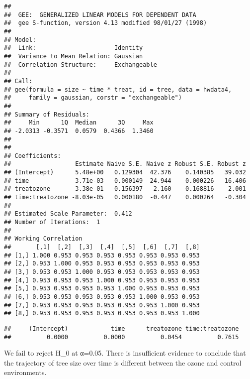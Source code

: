 \documentclass[
]{article}
\newenvironment{Shaded}{\begin{snugshade}}{\end{snugshade}}
\newcommand{\AttributeTok}[1]{\textcolor[rgb]{0.13,0.29,0.53}{#1}}
\newcommand{\CommentTok}[1]{\textcolor[rgb]{0.56,0.35,0.01}{\textit{#1}}}
\newcommand{\DecValTok}[1]{\textcolor[rgb]{0.00,0.00,0.81}{#1}}
\newcommand{\FunctionTok}[1]{\textcolor[rgb]{0.13,0.29,0.53}{\textbf{#1}}}
\newcommand{\NormalTok}[1]{#1}
\newcommand{\SpecialCharTok}[1]{\textcolor[rgb]{0.81,0.36,0.00}{\textbf{#1}}}
\begin{document}
\begin{verbatim}
## 
##  GEE:  GENERALIZED LINEAR MODELS FOR DEPENDENT DATA
##  gee S-function, version 4.13 modified 98/01/27 (1998) 
## 
## Model:
##  Link:                      Identity 
##  Variance to Mean Relation: Gaussian 
##  Correlation Structure:     Exchangeable 
## 
## Call:
## gee(formula = size ~ time * treat, id = tree, data = hwdata4, 
##     family = gaussian, corstr = "exchangeable")
## 
## Summary of Residuals:
##     Min      1Q  Median      3Q     Max 
## -2.0313 -0.3571  0.0579  0.4366  1.3460 
## 
## 
## Coefficients:
##                  Estimate Naive S.E. Naive z Robust S.E. Robust z
## (Intercept)      5.48e+00   0.129304  42.376    0.140385   39.032
## time             3.71e-03   0.000149  24.944    0.000226   16.406
## treatozone      -3.38e-01   0.156397  -2.160    0.168816   -2.001
## time:treatozone -8.03e-05   0.000180  -0.447    0.000264   -0.304
## 
## Estimated Scale Parameter:  0.412
## Number of Iterations:  1
## 
## Working Correlation
##       [,1]  [,2]  [,3]  [,4]  [,5]  [,6]  [,7]  [,8]
## [1,] 1.000 0.953 0.953 0.953 0.953 0.953 0.953 0.953
## [2,] 0.953 1.000 0.953 0.953 0.953 0.953 0.953 0.953
## [3,] 0.953 0.953 1.000 0.953 0.953 0.953 0.953 0.953
## [4,] 0.953 0.953 0.953 1.000 0.953 0.953 0.953 0.953
## [5,] 0.953 0.953 0.953 0.953 1.000 0.953 0.953 0.953
## [6,] 0.953 0.953 0.953 0.953 0.953 1.000 0.953 0.953
## [7,] 0.953 0.953 0.953 0.953 0.953 0.953 1.000 0.953
## [8,] 0.953 0.953 0.953 0.953 0.953 0.953 0.953 1.000
\end{verbatim}

\begin{Shaded}
\end{Shaded}

\begin{verbatim}
##     (Intercept)            time      treatozone time:treatozone 
##          0.0000          0.0000          0.0454          0.7615
\end{verbatim}

We fail to reject H\_0 at α=0.05. There is insufficient evidence to
conclude that the trajectory of tree size over time is different between
the ozone and control environments.
\end{document}
